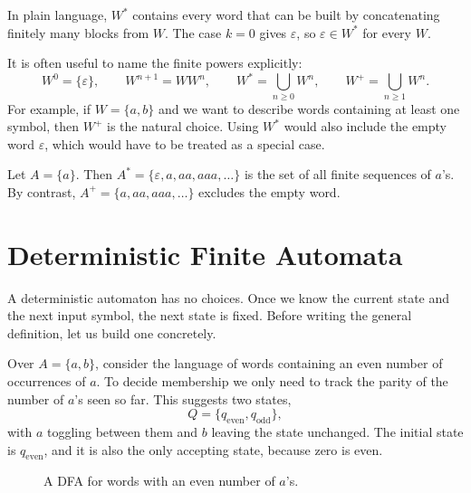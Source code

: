 In plain language, $W^*$ contains every word that can be built by
concatenating finitely many blocks from $W$.  The case $k=0$ gives
$\varepsilon$, so $\varepsilon\in W^*$ for every $W$.

It is often useful to name the finite powers explicitly:
\[
  W^0=\{\varepsilon\},
  \qquad
  W^{n+1}=WW^n,
  \qquad
  W^*=\bigcup_{n\geq 0}W^n,
  \qquad
  W^+=\bigcup_{n\geq 1}W^n.
\]
For example, if $W=\{a,b\}$ and we want to describe words containing
at least one symbol, then $W^+$ is the natural choice. Using $W^*$
would also include the empty word $\varepsilon$, which would have to be
treated as a special case.

\begin{example}
\label{ex:unary-words}
Let $A=\{a\}$.  Then $A^*=\{\varepsilon,a,aa,aaa,\ldots\}$ 
is the set of all finite sequences of $a$'s.
By contrast, $A^+=\{a,aa,aaa,\ldots\}$ excludes the empty word.
\end{example}


\section{Deterministic Finite Automata}
\label{sec:dfa}

A deterministic automaton has no choices.  Once we know the current
state and the next input symbol, the next state is fixed.  Before
writing the general definition, let us build one concretely.

\begin{example}
\label{ex:even-a-dfa}
Over $A=\{a,b\}$, consider the language of words containing an
even number of occurrences of $a$.  To decide membership we only need
to track the parity of the number of $a$'s seen so far.  This suggests
two states,
\[
  Q=\{q_{\mathrm{even}},q_{\mathrm{odd}}\},
\]
with $a$ toggling between them and $b$ leaving the state unchanged.
The initial state is $q_{\mathrm{even}}$, and it is also the only
accepting state, because zero is even.
\end{example}

\begin{figure}[ht]
\centering
{}
\caption{A DFA for words with an even number of $a$'s.}
\label{fig:even-a-dfa}
\end{figure}

